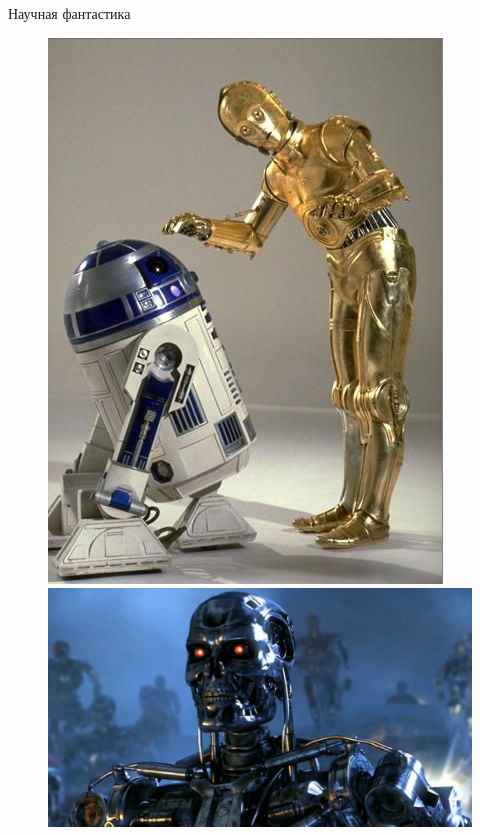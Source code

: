 \documentclass[10pt]{beamer}
\begin{document}
\begin{frame} {Научная фантастика}
	\begin{figure}
		\centering
		\begin{minipage}{.33\textwidth}
		  \includegraphics[width=0.9 \linewidth, height=0.9 \textheight, keepaspectratio]{images/c3po_r2d2}
		\end{minipage}%
		\begin{minipage}{.33\textwidth}
				\begin{minipage}{\textwidth}
			  \includegraphics[width=0.9 \linewidth, height=0.9 \textheight, keepaspectratio]{images/terminator}

\end{minipage}
\end{minipage}
\end{figure}
\end{frame}
\end{document}
